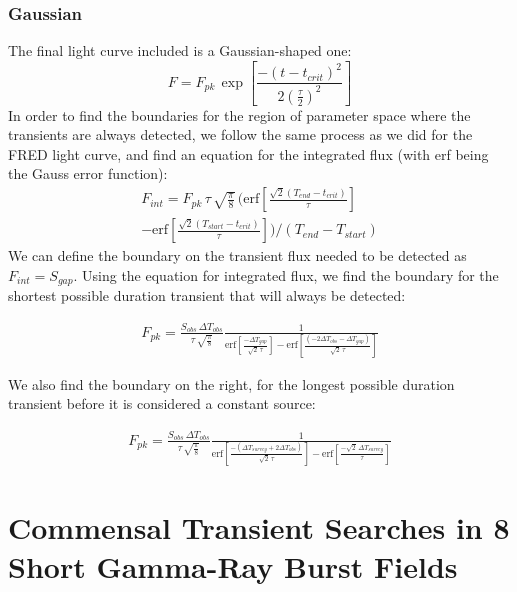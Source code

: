 \documentclass[12pt]{article}
\begin{document}
\subsubsection{Gaussian}
The final light curve included is a Gaussian-shaped one:
\begin{equation}F=F_{pk}\,\exp\left[\frac{-(t-t_{crit})^2}{2\left(\frac{\tau}{2}\right)^2}\right]\end{equation}
In order to find the boundaries for the region of parameter space where the transients are always detected, we follow the same process as we did for the FRED light curve, and find an equation for the integrated flux (with erf being the Gauss error function): 
\begin{equation}
\begin{split}
    F_{int} = F_{pk}\,\tau\,\sqrt{\frac{\pi}{8}}\,(\text{erf}\left[\frac{\sqrt{2}(T_{end}-t_{crit})}{\tau}\right]\\
    -\text{erf}\left[\frac{\sqrt{2}(T_{start}-t_{crit})}{\tau}\right])/(T_{end}-T_{start})
\end{split}
\end{equation}
We can define the boundary on the transient flux needed to be detected as $F_{int}=S_{gap}$.
Using the equation for integrated flux, we find the boundary for the shortest possible duration transient that will always be detected:

\begin{equation}
\begin{split}
    F_{pk} = \frac{S_{obs}\,\Delta T_{obs}}{\tau\, \sqrt{\frac{\pi}{8}}}\frac{1}{\text{erf}\left[\frac{-\Delta T_{gap}}{\sqrt{2}\,\tau}\right] - \text{erf}\left[\frac{(-2\Delta T_{obs} - \Delta T_{gap})}{\sqrt{2}\,\tau}\right]}
\end{split}
\end{equation}

We also find the boundary on the right, for the longest possible duration transient before it is considered a constant source:

\begin{equation}
\begin{split}
    F_{pk} = \frac{S_{obs}\,\Delta T_{obs}}{\tau\, \sqrt{\frac{\pi}{8}}}\frac{1}{\text{erf}\left[\frac{-(\Delta T_{survey} + 2\Delta T_{obs})}{\sqrt{2}\,\tau}\right] - \text{erf}\left[\frac{-\sqrt{2}\,\Delta T_{survey}}{\tau}\right]}
\end{split}
\end{equation}
\newpage
\section{Commensal Transient Searches in 8 Short Gamma-Ray Burst Fields}
\end{document}
